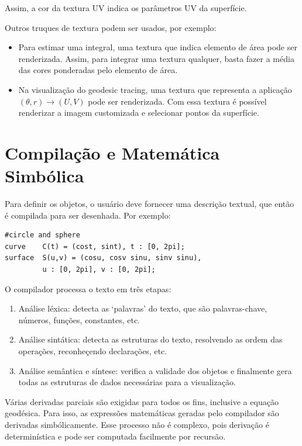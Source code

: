 \documentclass[10pt,a4paper]{article}
\begin{document}
Assim, a cor da textura UV indica os parâmetros UV da superfície.

Outros truques de textura podem ser usados, por exemplo:

\begin{itemize}
\item Para estimar uma integral, uma textura que indica elemento de área pode ser renderizada.
Assim, para integrar uma textura qualquer, basta fazer a média das cores ponderadas pelo elemento de área.

\item Na visualização do geodesic tracing, uma textura que representa
a aplicação $(\theta, r) \rightarrow (U, V)$ pode ser renderizada.
Com essa textura é possível renderizar a imagem customizada e selecionar pontos da superfície.
\end{itemize}

\newpage
\section*{Compilação e Matemática Simbólica}

Para definir os objetos, o usuário deve fornecer uma descrição textual, que então é compilada para ser desenhada.
Por exemplo:

\begin{lstlisting}[frame=single, caption=Descrição textual]
#circle and sphere
curve	 C(t) = (cost, sint), t : [0, 2pi];
surface	 S(u,v) = (cosu, cosv sinu, sinv sinu),
	     u : [0, 2pi], v : [0, 2pi];
\end{lstlisting}

O compilador processa o texto em três etapas:

\begin{enumerate}
\item Análise léxica: detecta as `palavras' do texto, que são palavras-chave, números, funções, constantes, etc.
\item Análise sintática: detecta as estruturas do texto, resolvendo as ordem das operações, reconheçendo declarações, etc.
\item Análise semântica e síntese: verifica a validade dos objetos
e finalmente gera todas as estruturas de dados necessárias para a visualização.
\end{enumerate}

Várias derivadas parciais são exigidas para todos os fins, inclusive a equação geodésica.
Para isso, as expressões matemáticas geradas pelo compilador são derivadas simbólicamente.
Esse processo não é complexo, pois derivação é determinística e pode ser computada facilmente por recursão.
\end{document}
